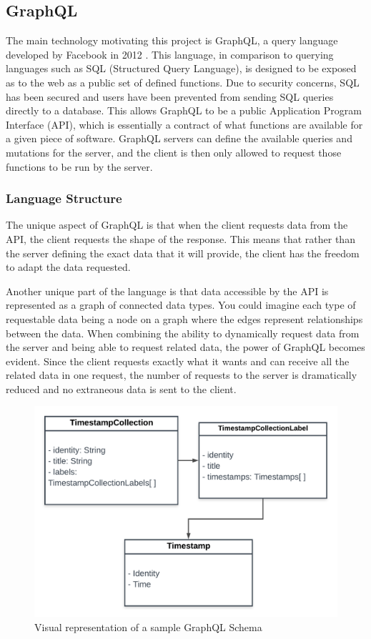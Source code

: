 \subsection{GraphQL}
The main technology motivating this project is GraphQL, a query language developed by Facebook in 2012 \cite{byronKeynoteBriefHistory2019}.  This language, in comparison to querying languages such as SQL (Structured Query Language), is designed to be exposed as to the web as a public set of defined functions.  Due to security concerns, SQL has been secured and users have been prevented from sending SQL queries directly to a database.  This allows GraphQL to be a public Application Program Interface (API), which is essentially a contract of what functions are available for a given piece of software.  GraphQL servers can define the available queries and mutations for the server, and the client is then only allowed to request those functions to be run by the server.

\subsubsection{Language Structure}

The unique aspect of GraphQL is that when the client requests data from the API, the client requests the shape of the response.  This means that rather than the server defining the exact data that it will provide, the client has the freedom to adapt the data requested.

Another unique part of the language is that data accessible by the API is represented as a graph of connected data types.  You could imagine each type of requestable data being a node on a graph where the edges represent relationships between the data.  When combining the ability to dynamically request data from the server and being able to request related data, the power of GraphQL becomes evident.  Since the client requests exactly what it wants and can receive all the related data in one request, the number of requests to the server is dramatically reduced and no extraneous data is sent to the client.

\begin{figure}[htbp]
    \centering
    \includegraphics[scale=.15]{img/schema-graph.png}
    \caption{Visual representation of a sample GraphQL Schema}
    \label{fig:schema-graph}
\end{figure}

